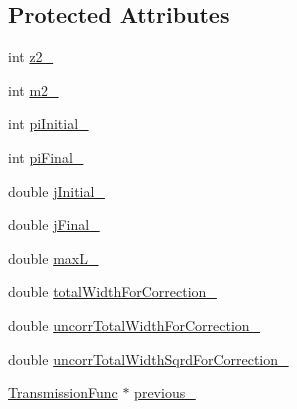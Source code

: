 \subsection*{Protected Attributes}
\begin{DoxyCompactItemize}
\item 
int \hyperlink{classTransmissionFunc_ac0a75ed458ba6c9072c5e66a9f2e43fc}{z2\-\_\-}
\item 
int \hyperlink{classTransmissionFunc_a67cef3345cf8acb114f843cf151bc787}{m2\-\_\-}
\item 
int \hyperlink{classTransmissionFunc_aef27640736868be8a9c956f05861c00c}{pi\-Initial\-\_\-}
\item 
int \hyperlink{classTransmissionFunc_a39bd39cf973b2c85b0e54ce9223d15ef}{pi\-Final\-\_\-}
\item 
double \hyperlink{classTransmissionFunc_aee6491ab4e09695bc11d1f2e1d5bbc7b}{j\-Initial\-\_\-}
\item 
double \hyperlink{classTransmissionFunc_a072b880c86bd5bba59867017e22baf27}{j\-Final\-\_\-}
\item 
double \hyperlink{classTransmissionFunc_abf332330b8f15b0dd8cdfe7e5596e8dc}{max\-L\-\_\-}
\item 
double \hyperlink{classTransmissionFunc_ac8f1c0f81f9cf02997700fd285a56a6c}{total\-Width\-For\-Correction\-\_\-}
\item 
double \hyperlink{classTransmissionFunc_a9933884d41c90c1f6e7190adf2eaf1b5}{uncorr\-Total\-Width\-For\-Correction\-\_\-}
\item 
double \hyperlink{classTransmissionFunc_a293237cc99320e8ccd8f9d87a2753110}{uncorr\-Total\-Width\-Sqrd\-For\-Correction\-\_\-}
\item 
\hyperlink{classTransmissionFunc}{Transmission\-Func} $\ast$ \hyperlink{classTransmissionFunc_aa236f5f98e157ac65a372026cc1e903b}{previous\-\_\-}
\end{DoxyCompactItemize}


